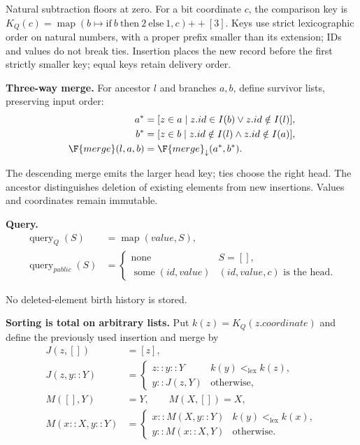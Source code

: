 Natural subtraction floors at zero. For a bit coordinate $c$, the comparison key is $K_Q(c)=\operatorname{map}(b\mapsto\mathrm{if}\ b\ \mathrm{then}\ 2\ \mathrm{else}\ 1,c)\mathbin{+\!+}[3]$. Keys use strict lexicographic order on natural numbers, with a proper prefix smaller than its extension; IDs and values do not break ties. Insertion places the new record before the first strictly smaller key; equal keys retain delivery order.

\textbf{Three-way merge.} For ancestor $l$ and branches $a,b$, define survivor lists, preserving input order:
\[
\begin{aligned}a^*&=[z\in a\mid z.id\in I(b)\lor z.id\notin I(l)],\\b^*&=[z\in b\mid z.id\notin I(l)\land z.id\notin I(a)],\\\F{merge}(l,a,b)&=\F{merge}_{\downarrow}(a^*,b^*).\end{aligned}
\]

The descending merge emits the larger head key; ties choose the right head. The ancestor distinguishes deletion of existing elements from new insertions. Values and coordinates remain immutable.

\textbf{Query.}
\[
\begin{aligned}\operatorname{query}_{Q}(S)&=\operatorname{map}(value,S),\\\operatorname{query}_{public}(S)&=\begin{cases}\operatorname{none}&S=[],\\\operatorname{some}(id,value)&(id,value,c)\text{ is the head.}\end{cases}\end{aligned}
\]

No deleted-element birth history is stored.

\textbf{Sorting is total on arbitrary lists.} Put $k(z)=K_Q(z.coordinate)$ and define the previously used insertion and merge by
\[
\begin{aligned}J(z,[])&=[z],\\J(z,y::Y)&=\begin{cases}z::y::Y&k(y)<_{\mathrm{lex}}k(z),\\y::J(z,Y)&\text{otherwise},\end{cases}\\M([],Y)&=Y,\qquad M(X,[])=X,\\M(x::X,y::Y)&=\begin{cases}x::M(X,y::Y)&k(y)<_{\mathrm{lex}}k(x),\\y::M(x::X,Y)&\text{otherwise}.\end{cases}\end{aligned}
\]

